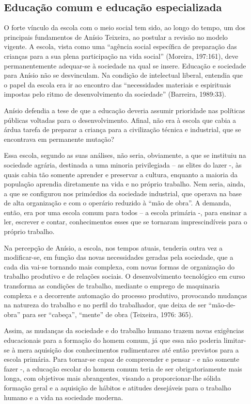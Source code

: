 \subsection{Educação comum e educação especializada}

O forte vínculo da escola com o meio social tem sido, ao longo do tempo, um
dos principais fundamentos de Anísio Teixeira, ao postular a revisão no modelo vigente.
A escola, vista como uma “agência social específica de preparação das crianças para a
sua plena participação na vida social” (Moreira, 197:161), deve permanentemente
adequar-se à sociedade na qual se insere. Educação e sociedade para Anísio não se
desvinculam. Na condição de intelectual liberal, entendia que o papel da escola era ir ao
encontro das “necessidades materiais e espirituais impostas pelo ritmo de
desenvolvimento da sociedade” (Barreira, 1989:33).

Anísio defendia a tese de que a educação deveria assumir prioridade nas
políticas públicas voltadas para o desenvolvimento. Afinal, não era à escola que cabia a
árdua tarefa de preparar a criança para a civilização técnica e industrial, que se
encontrava em permanente mutação?

Essa escola, segundo as suas análises, não seria, obviamente, a que se instituiu
na sociedade agrária, destinada a uma minoria privilegiada – as elites do lazer -, às
quais cabia tão somente aprender e preservar a cultura, enquanto a maioria da população
aprendia diretamente na vida e no próprio trabalho. Nem seria, ainda, a que se
configurou nos primórdios da sociedade industrial, que operava na base de alta
organização e com o operário reduzido à “mão de obra”. A demanda, então, era por uma
escola comum para todos – a escola primária -, para ensinar a ler, escrever e contar,
conhecimentos esses que se tornaram imprescindíveis para o próprio trabalho.

Na percepção de Anísio, a escola, nos tempos atuais, tenderia outra vez a
modificar-se, em função das novas necessidades geradas pela sociedade, que a cada dia
vai-se tornando mais complexa, com novas formas de organização do trabalho
produtivo e de relações sociais. O desenvolvimento tecnológico em curso transforma as
condições de trabalho, mediante o emprego de maquinaria complexa e a decorrente
automação do processo produtivo, provocando mudanças na natureza do trabalho e no
perfil do trabalhador, que deixa de ser “mão-de-obra” para ser “cabeça”, “mente” de
obra (Teixeira, 1976: 365).

Assim, as mudanças da sociedade e do trabalho humano trazem novas
exigências educacionais para a formação do homem comum, já que essa não poderia
limitar-se à mera aquisição dos conhecimentos rudimentares até então previstos para a
escola primária. Para tornar-se capaz de compreender e pensar - e não somente fazer -,
a educação escolar do homem comum teria de ser obrigatoriamente mais longa, com
objetivos mais abrangentes, visando a proporcionar-lhe sólida formação geral e a
aquisição de hábitos e atitudes desejáveis para o trabalho humano e a vida na sociedade
moderna.

